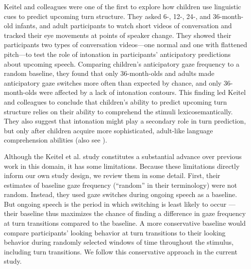 \documentclass[authoryear, 12pt]{elsarticle}
\begin{document}

Keitel and colleagues \citeyearpar{keitel2013} were one of the first to explore how children use linguistic cues to predict upcoming turn structure. They asked 6-, 12-, 24-, and 36-month-old infants, and adult participants to watch short videos of conversation and tracked their eye movements at points of speaker change. They showed their participants two types of conversation videos---one normal and one with flattened pitch---to test the role of intonation in participants' anticipatory predictions about upcoming speech. Comparing children's anticipatory gaze frequency to a random baseline, they found that only 36-month-olds and adults made anticipatory gaze switches more often than expected by chance, and only 36-month-olds were affected by a lack of intonation contours. This finding led Keitel and colleagues to conclude that children's ability to predict upcoming turn structure relies on their ability to comprehend the stimuli lexicosemantically. They also suggest that intonation might play a secondary role in turn prediction, but only after children acquire more sophisticated, adult-like language comprehension abilities (also see \citealp{keitel2015}).

Although the Keitel et al. \citeyearpar{keitel2013} study constitutes a substantial advance over previous work in this domain, it has some limitations. Because these limitations directly inform our own study design, we review them in some detail. First, their estimates of baseline gaze frequency (``random'' in their terminology) were not random. Instead, they used gaze switches during ongoing speech as a baseline. But ongoing speech is the period in which switching is least likely to occur \citep{hirvenkari2013}---their baseline thus maximizes the chance of finding a difference in gaze frequency at turn transitions compared to the baseline. A more conservative baseline would compare participants' looking behavior at turn transitions to their looking behavior during randomly selected windows of time throughout the stimulus, including turn transitions. We follow this conservative approach in the current study. 
\end{document}
